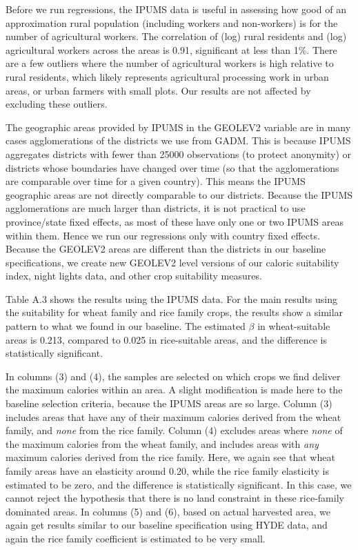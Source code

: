 \documentclass[11pt]{article}
\begin{document}
Before we run regressions, the IPUMS data is useful in assessing how good of an approximation rural population (including workers and non-workers) is for the number of agricultural workers. The correlation of (log) rural residents and (log) agricultural workers across the areas is 0.91, significant at less than 1\%. There are a few outliers where the number of agricultural workers is high relative to rural residents, which likely represents agricultural processing work in urban areas, or urban farmers with small plots. Our results are not affected by excluding these outliers.

The geographic areas provided by IPUMS in the GEOLEV2 variable are in many cases agglomerations of the districts we use from GADM. This is because IPUMS aggregates districts with fewer than 25000 observations (to protect anonymity) or districts whose boundaries have changed over time (so that the agglomerations are comparable over time for a given country). This means the IPUMS geographic areas are not directly comparable to our districts. Because the IPUMS agglomerations are much larger than districts, it is not practical to use province/state fixed effects, as most of these have only one or two IPUMS areas within them. Hence we run our regressions only with country fixed effects. Because the GEOLEV2 areas are different than the districts in our baseline specifications, we create new GEOLEV2 level versions of our caloric suitability index, night lights data, and other crop suitability measures. 

Table A.3 shows the results using the IPUMS data. For the main results using the suitability for wheat family and rice family crops, the results show a similar pattern to what we found in our baseline. The estimated $\beta$ in wheat-suitable areas is 0.213, compared to 0.025 in rice-suitable areas, and the difference is statistically significant. 

In columns (3) and (4), the samples are selected on which crops we find deliver the maximum calories within an area. A slight modification is made here to the baseline selection criteria, because the IPUMS areas are so large. Column (3) includes areas that have any of their maximum calories derived from the wheat family, and \textit{none} from the rice family. Column (4) excludes areas where \textit{none} of the maximum calories from the wheat family, and includes areas with \textit{any} maximum calories derived from the rice family. Here, we again see that wheat family areas have an elasticity around 0.20, while the rice family elasticity is estimated to be zero, and the difference is statistically significant. In this case, we cannot reject the hypothesis that there is no land constraint in these rice-family dominated areas. In columns (5) and (6), based on actual harvested area, we again get results similar to our baseline specification using HYDE data, and again the rice family coefficient is estimated to be very small. 
\end{document}
